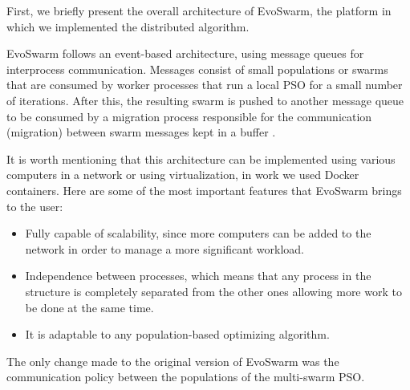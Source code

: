 \documentclass[runningheads]{llncs}
\begin{document}
First, we briefly present the overall architecture of EvoSwarm, the 
platform in which we implemented the distributed algorithm. 

EvoSwarm follows an event-based architecture, using message queues for
interprocess communication. Messages consist of small populations or swarms that
are consumed by worker processes that run a local PSO for a small number of
iterations. After this, the resulting swarm is pushed to another message queue
to be consumed by a migration process responsible for the communication
(migration) between swarm messages kept in a buffer \cite{b18}.



It is worth mentioning that this architecture can be implemented using various
computers in a network or using virtualization, in work we used Docker containers. 
Here are some of the most important features that
EvoSwarm brings to the user:

\begin{itemize} 
  
  \item Fully capable of scalability, since more computers can be added to the
  network in order to manage a more significant workload.
    
    \item Independence between processes, which means that any process in the
    structure is completely separated from the other ones allowing more work to
    be done at the same time.
    
    \item It is adaptable to any population-based optimizing algorithm.
\end{itemize}

The only change made to the original version of EvoSwarm \cite{b18} was the communication policy between the
populations of the multi-swarm PSO.

\end{document}
